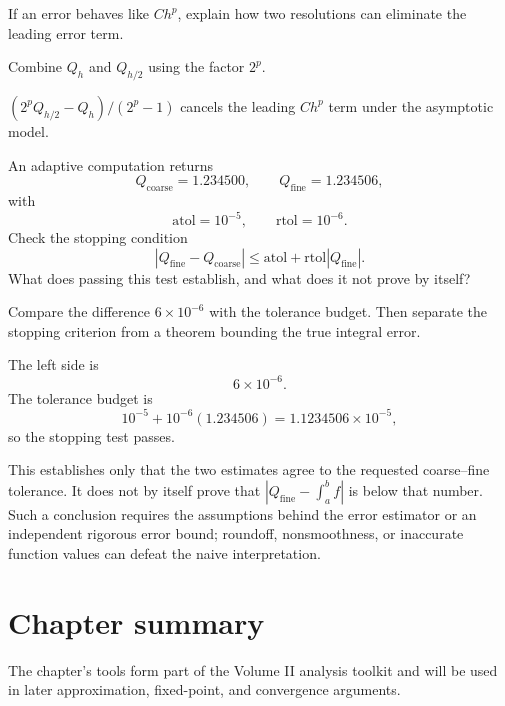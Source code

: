 \begin{exercise}\label{exr:ii24-expand-16}
If an error behaves like \(Ch^p\), explain how two resolutions can eliminate the leading error term.
\end{exercise}
\begin{hint}
Combine \(Q_h\) and \(Q_{h/2}\) using the factor \(2^p\).
\end{hint}
\begin{solution}
\((2^pQ_{h/2}-Q_h)/(2^p-1)\) cancels the leading \(Ch^p\) term under the asymptotic model.
\end{solution}
\begin{exercise}\label{exr:ii24-numerical-tolerance-01}
An adaptive computation returns
\[
Q_{\mathrm{coarse}}=1.234500,
\qquad
Q_{\mathrm{fine}}=1.234506,
\]
with
\[
\mathrm{atol}=10^{-5},
\qquad
\mathrm{rtol}=10^{-6}.
\]
Check the stopping condition
\[
|Q_{\mathrm{fine}}-Q_{\mathrm{coarse}}|
\le
\mathrm{atol}
+
\mathrm{rtol}|Q_{\mathrm{fine}}|.
\]
What does passing this test establish, and what does it not prove by itself?
\end{exercise}
\begin{hint}
Compare the difference \(6\times10^{-6}\) with the tolerance budget.  Then
separate the stopping criterion from a theorem bounding the true integral
error.
\end{hint}
\begin{solution}
The left side is
\[
6\times10^{-6}.
\]
The tolerance budget is
\[
10^{-5}+10^{-6}(1.234506)
=
1.1234506\times10^{-5},
\]
so the stopping test passes.

This establishes only that the two estimates agree to the requested
coarse--fine tolerance.  It does not by itself prove that
\(|Q_{\mathrm{fine}}-\int_a^b f|\) is below that number.  Such a conclusion
requires the assumptions behind the error estimator or an independent rigorous
error bound; roundoff, nonsmoothness, or inaccurate function values can defeat
the naive interpretation.
\end{solution}
\section*{Chapter summary}
The chapter's tools form part of the Volume II analysis toolkit and will be used in later approximation, fixed-point, and convergence arguments.
